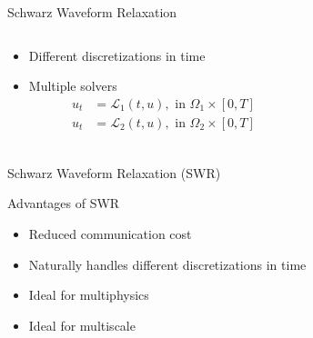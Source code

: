 \documentclass[]{beamer}
\begin{document}
\begin{frame}{Schwarz Waveform Relaxation}

  \begin{columns}

    \begin{column}{.4\textwidth}

      \begin{itemize}
      \item<+-> Different discretizations in time
      \item<+-> Multiple solvers
        \begin{align*}
          u_t &=  \mathcal{L}_1(t,u), \text{ in } \Omega_1\times[0,T]\\
          u_t &=  \mathcal{L}_2(t,u), \text{ in } \Omega_2\times[0,T]\\
        \end{align*}
      \end{itemize}
      
    \end{column}

    \begin{column}{.6\textwidth}

      \begin{figure}
        \centering
      \end{figure}

    \end{column}
  \end{columns}
\end{frame}


\begin{frame}{Schwarz Waveform Relaxation (SWR)}

  Advantages of SWR
  \begin{itemize}
  \item Reduced communication cost
  \item Naturally handles different discretizations in time
  \item Ideal for multiphysics
  \item Ideal for multiscale
  \end{itemize}

\end{frame}
\end{document}
